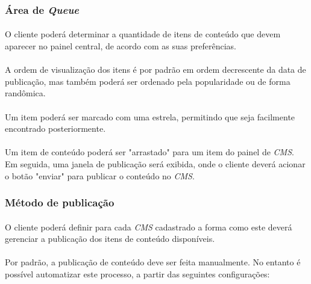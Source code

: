 \documentclass[a4paper,12pt]{article}
\def\cms{\emph{CMS}}
\begin{document}
\subsubsection{Área de \emph{Queue}}

\paragraph{}
O cliente poderá determinar a quantidade de itens de conteúdo que devem
aparecer no painel central, de acordo com as suas preferências.

\paragraph{}
A ordem de visualização dos itens é por padrão em ordem decrescente da data de
publicação, mas também poderá ser ordenado pela popularidade ou de forma
randômica.

\paragraph{}
Um item poderá ser marcado com uma estrela, permitindo que seja facilmente
encontrado posteriormente.

\paragraph{}
Um item de conteúdo poderá ser "arrastado" para um item do painel de \cms{}. Em
seguida, uma janela de publicação será exibida, onde o cliente deverá acionar o
botão "enviar" para publicar o conteúdo no \cms{}.

\subsubsection{Método de publicação}

\paragraph{}
O cliente poderá definir para cada \cms{} cadastrado a forma como este deverá
gerenciar a publicação dos itens de conteúdo disponíveis.

\paragraph{}
Por padrão, a publicação de conteúdo deve ser feita manualmente. No entanto é
possível automatizar este processo, a partir das seguintes configurações:
\end{document}
